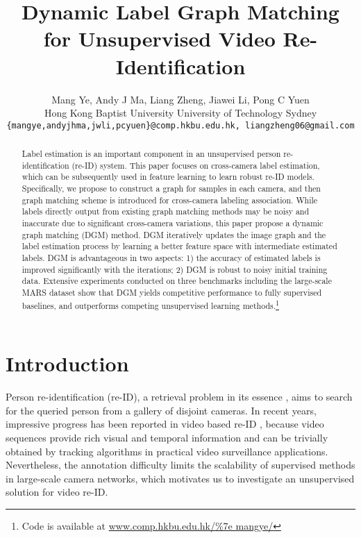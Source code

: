 \documentclass[10pt,twocolumn,letterpaper]{article}
\begin{document}
\title{Dynamic Label Graph Matching for Unsupervised Video Re-Identification}

\author{Mang Ye, Andy J Ma, Liang Zheng, Jiawei Li, Pong C Yuen \\
 Hong Kong Baptist University \quad \quad  University of Technology Sydney \\
{\tt\small \{mangye,andyjhma,jwli,pcyuen\}@comp.hkbu.edu.hk, liangzheng06@gmail.com}
}

\maketitle
\thispagestyle{empty}

\begin{abstract}

Label estimation is an important component in an unsupervised person re-identification (re-ID) system. This paper focuses on cross-camera label estimation, which can be subsequently used in feature learning to learn robust re-ID models. Specifically, we propose to construct a graph for samples in each camera, and then graph matching scheme is introduced for cross-camera labeling association. While labels directly output from existing graph matching methods may be noisy and inaccurate due to significant cross-camera variations, this paper propose a dynamic graph matching (DGM) method. DGM iteratively updates the image graph and the label estimation process by learning a better feature space with intermediate estimated labels. DGM is advantageous in two aspects: 1) the accuracy of estimated labels is improved significantly with the iterations; 2) DGM is robust to noisy initial training data. Extensive experiments conducted on three benchmarks including the large-scale MARS dataset show that DGM yields competitive performance to fully supervised baselines, and outperforms competing unsupervised learning methods.\footnote{Code is available at \url{www.comp.hkbu.edu.hk/\%7e mangye/}}

\end{abstract}

\section{Introduction}
Person re-identification (re-ID), a retrieval problem in its essence \cite{zheng2017sift,tmm16rank,arxiv17survey}, aims to search for the queried person from a gallery of disjoint cameras. In recent years, impressive progress has been reported in video based re-ID \cite{cvpr16top,cvpr16video,eccv16mars}, because video sequences provide rich visual and temporal information and can be trivially obtained by tracking algorithms \cite{tip15track,aaai17track} in practical video surveillance applications. Nevertheless, the annotation difficulty limits the scalability of supervised methods in large-scale camera networks, which motivates us to investigate an unsupervised solution for video re-ID.
\end{document}
